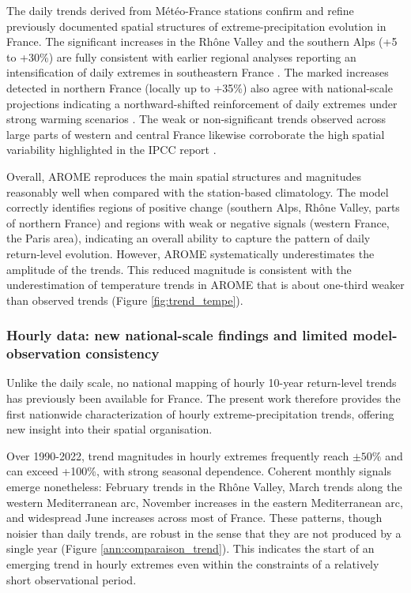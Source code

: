 \documentclass[hess, manuscript]{copernicus}
\begin{document}
The daily trends derived from Météo-France stations confirm and refine previously documented spatial structures of extreme-precipitation evolution in France. The significant increases in the Rhône Valley and the southern Alps (+5 to +30\%) are fully consistent with earlier regional analyses reporting an intensification of daily extremes in southeastern France \citep{Blanchet2018,blanchet2021explaining,Ribes2019}. The marked increases detected in northern France (locally up to +35\%) also agree with national-scale projections indicating a northward-shifted reinforcement of daily extremes under strong warming scenarios \citep{soubeyroux:hal-04991790}. The weak or non-significant trends observed across large parts of western and central France likewise corroborate the high spatial variability highlighted in the IPCC report \citep{IPCC2021}.

Overall, AROME reproduces the main spatial structures and magnitudes reasonably well when compared with the station-based climatology. The model correctly identifies regions of positive change (southern Alps, Rhône Valley, parts of northern France) and regions with weak or negative signals (western France, the Paris area), indicating an overall ability to capture the pattern of daily return-level evolution. However, AROME systematically underestimates the amplitude of the trends. This reduced magnitude is consistent with the underestimation of temperature trends in AROME that is about one-third weaker than observed trends (Figure \ref{fig:trend_tempe}).

\subsubsection{Hourly data: new national-scale findings and limited model-observation consistency}

Unlike the daily scale, no national mapping of hourly 10-year return-level trends has previously been available for France. The present work therefore provides the first nationwide characterization of hourly extreme-precipitation trends, offering new insight into their spatial organisation.

Over 1990-2022, trend magnitudes in hourly extremes frequently reach $\pm 50\%$ and can exceed +100\%, with strong seasonal dependence. Coherent monthly signals emerge nonetheless: February trends in the Rhône Valley, March trends along the western Mediterranean arc, November increases in the eastern Mediterranean arc, and widespread June increases across most of France. These patterns, though noisier than daily trends, are robust in the sense that they are not produced by a single year (Figure \ref{ann:comparaison_trend}). This indicates the start of an emerging trend in hourly extremes even within the constraints of a relatively short observational period.
\end{document}
